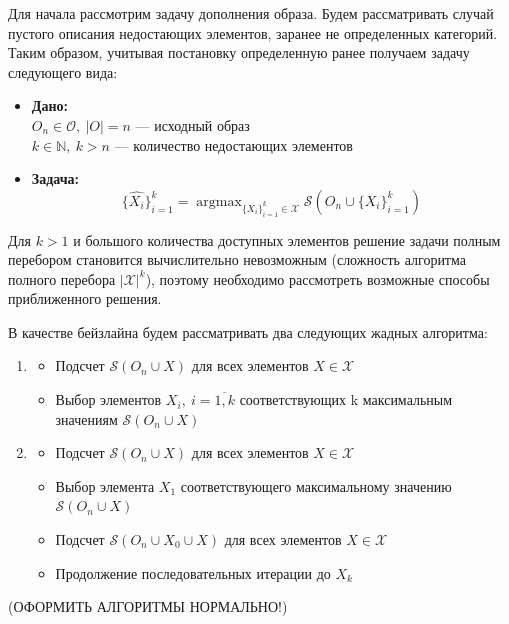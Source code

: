 \documentclass[a4paper,12pt]{article}
\DeclareMathOperator*{\argmax}{argmax}
\begin{document}
				Для начала рассмотрим задачу дополнения образа. Будем рассматривать случай пустого описания недостающих элементов, заранее не определенных категорий. Таким образом, учитывая постановку определенную ранее получаем задачу следующего вида:
				\begin{itemize}
					\item \textbf{Дано:}\\
					$O_n\in\mathcal{O}, ~|O| = n$ --- исходный образ \\
					$k \in \mathbb{N}, ~k > n$ --- количество недостающих элементов\\					
					\item \textbf{Задача:}\\
					$$\{\hat{X_i}\}_{i=1}^k= \argmax_{\{X_i\}_{i=1}^k\in\mathcal{X}} \mathcal{S}\left(O_n\cup\{X_i\}_{i=1}^k\right)$$
				\end{itemize}
				Для $k > 1$ и большого количества доступных элементов решение задачи полным перебором  становится вычислительно невозможным (сложность алгоритма полного перебора $|\mathcal{X}|^k$), поэтому необходимо рассмотреть возможные способы приближенного решения. 
				
				В качестве бейзлайна будем рассматривать два следующих жадных алгоритма:
				\begin{enumerate}
					\item \begin{itemize}
									\item Подсчет $\mathcal{S}(O_n \cup X)$ для всех элементов $X\in \mathcal{X}$
									\item Выбор элементов $X_i,~i=\overline{1,k}$ соответствующих k максимальным значениям $\mathcal{S}(O_n \cup X)$
								\end{itemize}
					\item \begin{itemize}
								\item Подсчет $\mathcal{S}(O_n \cup X)$ для всех элементов $X\in \mathcal{X}$
								\item Выбор элемента $X_1$ соответствующего максимальному значению $\mathcal{S}(O_n \cup X)$
								\item Подсчет $\mathcal{S}(O_n \cup X_0\cup X)$ для всех элементов $X\in \mathcal{X}$
								\item Продолжение последовательных итерации до $X_k$
							\end{itemize}
				\end{enumerate}
			(ОФОРМИТЬ АЛГОРИТМЫ НОРМАЛЬНО!)
\end{document}
